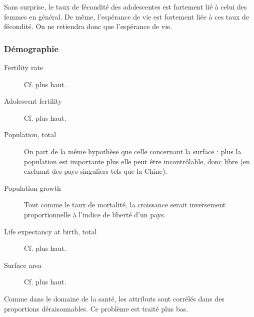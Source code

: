 Sans surprise, le taux de fécondité des adolescentes est fortement lié à celui des femmes en général. De même, l'espérance de vie est fortement liée à ces taux de fécondité. On ne retiendra donc que l'espérance de vie.

\subsubsection{Démographie} 
\begin{description}
\item [Fertility rate]
Cf. plus haut.
\item [Adolescent fertility]
Cf. plus haut.
\item [Population, total]
On part de la même hypothèse que celle concernant la surface : plus la population est importante plus elle peut être incontrôlable, donc libre (en excluant des pays singuliers tels que la Chine).
\item [Population growth]
Tout comme le taux de mortalité, la croissance serait inversement proportionnelle à l'indice de liberté d'un pays.
\item [Life expectancy at birth, total]
Cf. plus haut.
\item [Surface area]
Cf. plus haut.
\end{description}

Comme dans le domaine de la santé, les attributs sont corrélés dans des proportions déraisonnables. Ce problème est traité plus bas.

